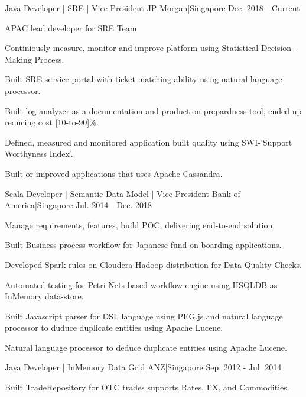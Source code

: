 \begin{cventries}
    {Java Developer | SRE | Vice President}
    {JP Morgan|Singapore}
    {Dec. 2018 - Current}
    {
      \begin{cvitems}
        \item {APAC lead developer for SRE Team}
        \item {Continiously measure, monitor and improve platform using Statistical Decision-Making Process.}
        \item {Built SRE service portal with ticket matching ability using natural language processor.}
        \item {Built log-analyzer as a documentation and production prepardness tool, ended up reducing cost [10-to-90]\%.}
        \item {Defined, measured and monitored application built quality using SWI-'Support Worthyness Index'.}
        \item {Built or improved applications that uses Apache Cassandra.}
      \end{cvitems}
    }
    {Scala Developer | Semantic Data Model | Vice President}
    {Bank of America|Singapore}
    {Jul. 2014 - Dec. 2018}
    {
      \begin{cvitems}
        \item {Manage requirements, features, build POC, delivering end-to-end solution.}
        \item {Built Business process workflow for Japanese fund on-boarding applications.}
        \item {Developed Spark rules on Cloudera  Hadoop distribution for Data Quality Checks.}
        \item {Automated testing for Petri-Nets based workflow engine using HSQLDB as InMemory data-store.}
        \item {Built Javascript parser for DSL language using PEG.js and natural language processor to duduce duplicate entities using Apache Lucene.}
        \item {Natural language processor to deduce duplicate entities using Apache Lucene.}
      \end{cvitems}
    }
    {Java Developer | InMemory Data Grid}
    {ANZ|Singapore}
    {Sep. 2012 - Jul. 2014}
    {
      \begin{cvitems}
        \item {Built TradeRepository for OTC trades  supports Rates, FX, and Commodities.}

\end{cvitems}}
\end{cventries}
